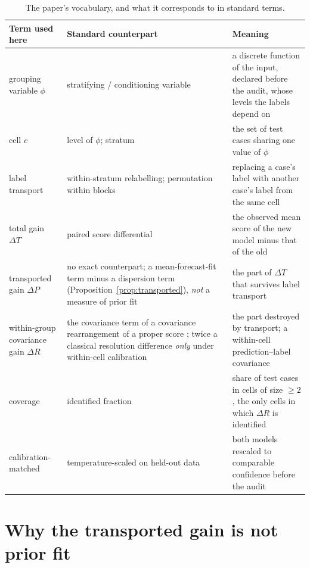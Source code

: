 \begin{table}[t]
\centering
\small
\caption{The paper's vocabulary, and what it corresponds to in standard terms.}
\label{tab:terms}
\begin{tabular}{@{}p{}p{}p{}@{}}
\toprule
Term used here & Standard counterpart & Meaning \\
\midrule
grouping variable $\phi$ &
stratifying / conditioning variable &
a discrete function of the input, declared before the audit, whose levels the labels
depend on \\
cell $c$ &
level of $\phi$; stratum &
the set of test cases sharing one value of $\phi$ \\
label transport &
within-stratum relabelling; permutation within blocks &
replacing a case's label with another case's label from the same cell \\
total gain $\Delta T$ &
paired score differential &
the observed mean score of the new model minus that of the old \\
transported gain $\Delta P$ &
no exact counterpart; a mean-forecast-fit term minus a dispersion term
(Proposition~\ref{prop:transported}), \emph{not} a measure of prior fit &
the part of $\Delta T$ that survives label transport \\
within-group covariance gain $\Delta R$ &
the covariance term of a covariance rearrangement of a proper score
\citep{yates1982external}; twice a classical resolution difference \emph{only} under
within-cell calibration &
the part destroyed by transport; a within-cell prediction--label covariance \\
coverage &
identified fraction &
share of test cases in cells of size $\ge2$, the only cells in which $\Delta R$ is
identified \\
calibration-matched &
temperature-scaled on held-out data &
both models rescaled to comparable confidence before the audit \\
\bottomrule
\end{tabular}
\end{table}

\section{Why the transported gain is not prior fit}\label{app:transported}

